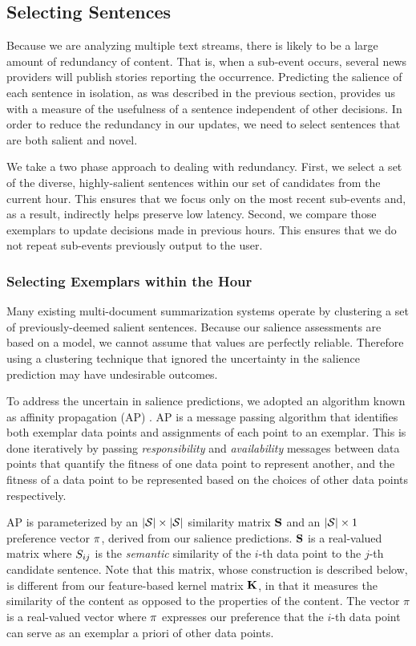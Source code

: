 \subsection{Selecting Sentences}
\label{sec:ap}
Because we are analyzing multiple text streams, there is likely to be a large amount of redundancy of content.  That is, when a sub-event occurs, several news providers will publish stories reporting the occurrence.  Predicting the salience of each sentence in isolation, as was described in the previous section, provides us with a measure of the usefulness of a sentence independent of other decisions.  In order to reduce the redundancy in our updates, we need to select sentences that  are both salient and novel.

We take a two phase approach to dealing with redundancy.  First, we select a set of the diverse, highly-salient sentences within our set of candidates from the current hour.  This ensures that we focus only on the most recent sub-events and, as a result, indirectly helps preserve low latency.  Second, we compare those exemplars to update decisions made in previous hours.  This ensures that we do not repeat sub-events previously output to the user.

\subsubsection{Selecting Exemplars within the Hour}

Many existing multi-document summarization systems operate by clustering a set of previously-deemed salient sentences.  Because our salience assessments are based on a model, we cannot assume that values are perfectly reliable.  Therefore using a clustering technique that ignored the uncertainty in the salience prediction may have undesirable outcomes.  


To address the uncertain in salience predictions, we adopted an algorithm known as affinity propagation (AP) \cite{dueck2007non}.  AP is a message passing algorithm that identifies both exemplar data points and assignments of each point to an exemplar.  This is done iteratively by passing \emph{responsibility} and \emph{availability} messages between data points that quantify the fitness of one data point to represent another, and the fitness of a data point to be represented based on the choices of other data points respectively.

AP is parameterized by an $|\mathcal{S}|\times |\mathcal{S}|$ similarity matrix $\mathbf{S}$ and an $|\mathcal{S}|\times 1$ preference vector $\mathbf{\pi}$, derived from our salience predictions.  $\mathbf{S}$ is a real-valued matrix where $S_{ij}$ is the \emph{semantic} similarity of the $i$-th data point to the $j$-th candidate sentence.  Note that this matrix, whose construction is described below, is different from our feature-based kernel matrix $\mathbf{K}$, in that it measures the similarity of the content as opposed to the properties of the content.   The vector $\pi$ is a real-valued vector where $\mathbf{\pi}$ expresses our preference that the $i$-th data point can serve as an exemplar a priori of other data points. 


